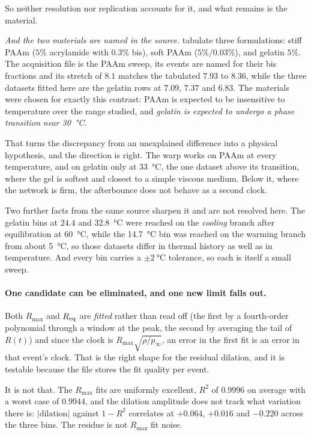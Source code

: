 \documentclass[10pt]{article}
\begin{document}
So neither resolution nor replication accounts for it, and what remains is the material.

\emph{And the two materials are named in the source.}  tabulate three
formulations: stiff PAAm ($5\%$ acrylamide with $0.3\%$ bis), soft PAAm ($5\%/0.03\%$), and
gelatin $5\%$. The acquisition file is the PAAm sweep, its events are named for their bis
fractions and its stretch of $8.1$ matches the tabulated $7.93$ to $8.36$, while the three
datasets fitted here are the gelatin rows at $7.09$, $7.37$ and $6.83$. The materials were chosen
for exactly this contrast: PAAm is expected to be insensitive to temperature over the range
studied, and \emph{gelatin is expected to undergo a phase transition near \SI{30}{\celsius}}.

That turns the discrepancy from an unexplained difference into a physical hypothesis, and the
direction is right. The warp works on PAAm at every temperature, and on gelatin only at
\SI{33}{\celsius}, the one dataset above its transition, where the gel is softest and closest
to a simple viscous medium. Below it, where the network is firm, the afterbounce does not behave
as a second clock.

Two further facts from the same source sharpen it and are not resolved here. The gelatin bins at
$24.4$ and \SI{32.8}{\celsius} were reached on the \emph{cooling} branch after equilibration at
\SI{60}{\celsius}, while the \SI{14.7}{\celsius} bin was reached on the warming branch from
about \SI{5}{\celsius}, so those datasets differ in thermal history as well as in temperature.
And every bin carries a $\pm\SI{2}{\celsius}$ tolerance, so each is itself a small sweep.

\paragraph{One candidate can be eliminated, and one new limit falls out.} Both $R_{\max}$ and
$R_{\rm eq}$ are \emph{fitted} rather than read off (the first by a fourth-order polynomial
through a window at the peak, the second by averaging the tail of $R(t)$) and since the clock
is $R_{\max}\sqrt{\rho/p_\infty}$, an error in the first fit is an error in that event's clock.
That is the right shape for the residual dilation, and it is testable because the file stores the
fit quality per event.

It is not that. The $R_{\max}$ fits are uniformly excellent, $R^2$ of $0.9996$ on average with
a worst case of $0.9944$, and the dilation amplitude does not track what variation there is:
$\lvert\text{dilation}\rvert$ against $1-R^2$ correlates at $+0.064$, $+0.016$ and $-0.220$
across the three bins. The residue is not $R_{\max}$ fit noise.
\end{document}
